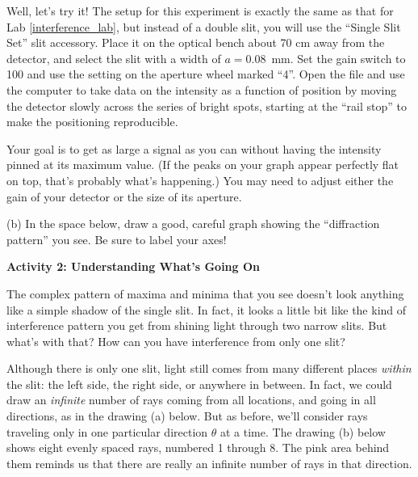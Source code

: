 Well, let's try it!  The setup for this experiment is exactly the same as that for Lab \ref{interference_lab},  but instead of a double slit, you will use the ``Single Slit Set'' slit accessory.  Place it on the optical bench about 70 cm away from the detector, and select the slit with a width of $a = 0.08$~mm.   Set the gain switch to 100 and use the setting on the aperture wheel marked ``4''.   Open the file  and use the computer to take data on the intensity as a function of position by moving the detector slowly across the series of bright spots, starting at the ``rail stop'' to make the positioning reproducible.  

Your goal is to get as large a signal as you can without having the intensity pinned at its maximum value.  (If the peaks on your graph appear perfectly flat on top, that's probably what's happening.) You may need to adjust either the gain of your detector or the size of its aperture.

(b) In the space below, draw a good, careful graph showing the ``diffraction pattern'' you see.  
Be sure to label your axes!
\answerspace{1.5in}

\pagebreak[2]
\textbf{Activity 2: Understanding What's Going On}

The complex pattern of maxima and minima that you see doesn't look anything like a simple shadow of the single slit.  In fact, it looks a little bit like the kind of interference pattern you get from shining light through two narrow slits.  But what's with that?  How can you have interference from only one slit?

Although there is only one slit, light still comes from many different places \textit{within} the slit: the left side, the right side, or anywhere in between.  In fact, we could draw an \textit{infinite} number of rays coming from all locations, and going in all directions, as in the drawing (a) below.  But as before, we'll consider rays traveling only in one particular direction $\theta$ at a time.  The drawing (b) below shows eight evenly spaced rays, numbered 1 through 8.  The pink area behind them reminds us that there are really an infinite number of rays in that direction.

